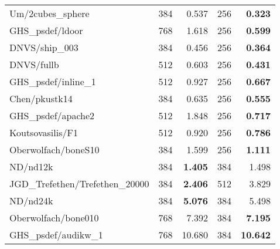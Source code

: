 \begin{tabular}{l|rr|rr}
  Um/2cubes\_sphere               & 384                       & 0.537     & 256 & \bf 0.323  \\
  GHS\_psdef/ldoor                & 768                       & 1.618     & 256 & \bf 0.599  \\
  DNVS/ship\_003                  & 384                       & 0.456     & 256 & \bf 0.364  \\
  DNVS/fullb                      & 512                       & 0.603     & 256 & \bf 0.431  \\
  GHS\_psdef/inline\_1            & 512                       & 0.927     & 256 & \bf 0.667  \\
  Chen/pkustk14                   & 384                       & 0.635     & 256 & \bf 0.555  \\
  GHS\_psdef/apache2              & 512                       & 1.848     & 256 & \bf 0.717  \\
  Koutsovasilis/F1                & 512                       & 0.920     & 256 & \bf 0.786  \\
  Oberwolfach/boneS10             & 384                       & 1.599     & 256 & \bf 1.111  \\
  ND/nd12k                        & 384                       & \bf 1.405 & 384 & 1.498      \\
  JGD\_Trefethen/Trefethen\_20000 & 384                       & \bf 2.406 & 512 & 3.829      \\
  ND/nd24k                        & 384                       & \bf 5.076 & 384 & 5.498      \\
  Oberwolfach/bone010             & 768                       & 7.392     & 384 & \bf 7.195  \\
  GHS\_psdef/audikw\_1            & 768                       & 10.680    & 384 & \bf 10.642 \\
  \hline
\end{tabular}

